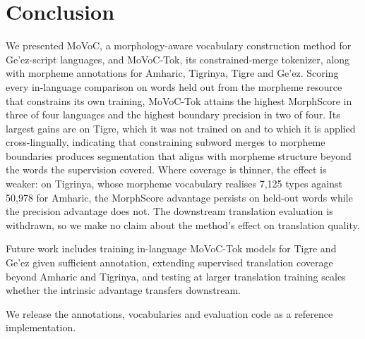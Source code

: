 \documentclass[11pt]{article}
\begin{document}
\section{Conclusion}
\label{sec:conclusion}

We presented MoVoC, a morphology-aware vocabulary construction method for
Ge'ez-script languages, and MoVoC-Tok, its constrained-merge tokenizer, along
with morpheme annotations for Amharic, Tigrinya, Tigre and Ge'ez. Scoring every
in-language comparison on words held out from the morpheme resource that
constrains its own training, MoVoC-Tok attains the highest MorphScore in three
of four languages and the highest boundary precision in two of four. Its
largest gains are on Tigre, which it was not trained on and to which it is
applied cross-lingually, indicating that constraining subword merges to
morpheme boundaries produces segmentation that aligns with morpheme structure
beyond the words the supervision covered. Where coverage is thinner, the effect
is weaker: on Tigrinya, whose morpheme vocabulary realises 7,125 types against
50,978 for Amharic, the MorphScore advantage persists on held-out words while
the precision advantage does not. The downstream translation evaluation is
withdrawn, so we make no claim about the method's effect on translation
quality.

Future work includes training in-language MoVoC-Tok models for Tigre and Ge'ez
given sufficient annotation, extending supervised translation coverage beyond
Amharic and Tigrinya, and testing at larger translation training scales whether
the intrinsic advantage transfers downstream.

We release the annotations, vocabularies and evaluation code as a reference
implementation.



\end{document}

